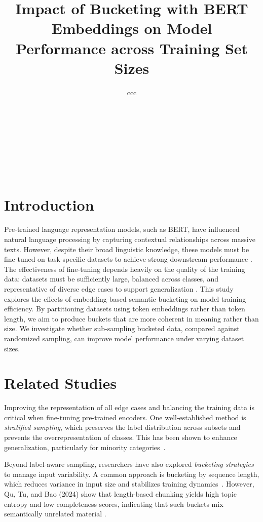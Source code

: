 \documentclass[twocolumn]{article}
\title{\textbf{Impact of Bucketing with BERT Embeddings on Model Performance across Training Set Sizes}}
\author{
    \begin{center}
        \begin{tabular}{ccc}
            \multicolumn{3}{c}{
            \begin{tabular}{ccc}
            \Large{Christian Harjuno\textdagger} & 
            \Large{Victor Silaa \textdagger} & 
            \Large{Yoko Nakajima\textdagger}
            \end{tabular}}\\[5pt]
            \multicolumn{3}{c}{
            \begin{tabular}{cc}
              \Large{Tomoyosi Akiba\textdaggerdbl} & \Large{Hirotoshi Honma\textdaggerdbl} 
            \end{tabular}} \\[5pt]
            \multicolumn{3}{c}{\textdagger\space Department of Computer Science, Kushiro College of Technology}\\
            \multicolumn{3}{c}{\texttt{p234071@kushiro.kosen-ac.jp, \{silaa,yoko,honma\}@kushiro-ct.ac.jp}}\\[2pt]
            \multicolumn{3}{c}{\textdaggerdbl\space Department of Computer Science and Engineering, Toyohashi University of Technology}\\
            \multicolumn{3}{c}{\texttt{akiba@cs.tut.ac.jp}}\\
            [4pt]
            \multicolumn{3}{c}{}\\[-8pt]
            \multicolumn{3}{c}{\textbf{Abstract}}\\
            \multicolumn{3}{p{6.4in}}{\normalsize
                \hspace*{1em} We investigate a semantic bucketing strategy based on BERT embeddings to improve overall model generalization performance on scarce data. Samples are grouped by semantic similarity rather than structural similarity, such as length, and evaluated across varying training dataset sizes. Fine-tuned model performance is evaluated using accuracy, precision, recall, and loss. The results are then compared to a model trained on randomly sampled data. Our experiments show that bucketing consistently yields better metrics on smaller dataset sizes yet reveals higher losses on slightly larger data sizes, suggesting less confident probability estimates.}
        \end{tabular}
    \end{center}
}
\date{}
\newcounter{ex}
\renewcommand{\indent}{\hspace*{2em}}
\begin{document}
\maketitle
\section{Introduction}
\thispagestyle{firstpage}
\indent Pre-trained language representation models, such as BERT, have influenced natural language processing by capturing contextual relationships across massive texts. However, despite their broad linguistic knowledge, these models must be fine-tuned on task-specific datasets to achieve strong downstream performance \cite{DBLP:journals/corr/abs-1810-04805}. The effectiveness of fine-tuning depends heavily on the quality of the training data: datasets must be sufficiently large, balanced across classes, and representative of diverse edge cases to support generalization \cite{zhang2024textbfonlyifrevealingdecisiveeffectinstruction}. This study explores the effects of embedding-based semantic bucketing on model training efficiency. By partitioning datasets using token embeddings rather than token length, we aim to produce buckets that are more coherent in meaning rather than size. We investigate whether sub-sampling bucketed data, compared against randomized sampling, can improve model performance under varying dataset sizes.

\section{Related Studies}
\indent Improving the representation of all edge cases and balancing the training data is critical when fine-tuning pre-trained encoders. One well-established method is \textit{stratified sampling}, which preserves the label distribution across subsets and prevents the overrepresentation of classes. This has been shown to enhance generalization, particularly for minority categories~\cite{merrillees2021stratifiedsamplingextrememultilabel}.

\indent Beyond label-aware sampling, researchers have also explored \textit{bucketing strategies} to manage input variability. A common approach is bucketing by sequence length, which reduces variance in input size and stabilizes training dynamics~\cite{dao2024transformers}. However, Qu, Tu, and Bao (2024) show that length-based chunking yields high topic entropy and low completeness scores, indicating that such buckets mix semantically unrelated material \cite{QuTuBao2024}.
\end{document}
